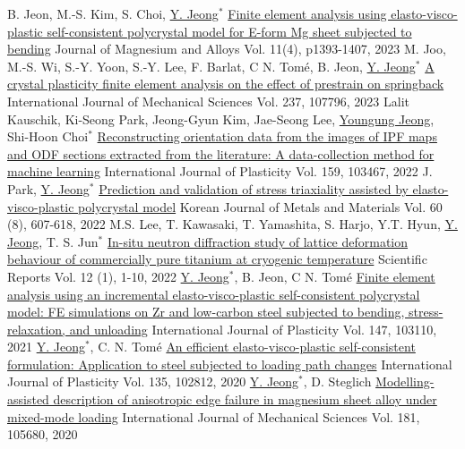 \begin{cventries}
  \cventry
  {B. Jeon, M.-S. Kim, S. Choi, \underline{Y. Jeong}$^*$}
  {\href{https://doi.org/10.1016/j.jma.2022.10.017}{Finite element analysis using elasto-visco-plastic self-consistent polycrystal model for E-form Mg sheet subjected to bending}}
  {Journal of Magnesium and Alloys}
  {Vol. 11(4), p1393-1407, 2023}
  {
  }
  \cventry
  {M. Joo, M.-S. Wi, S.-Y. Yoon, S.-Y. Lee, F. Barlat, C N. Tom\'{e}, B. Jeon, \underline{Y. Jeong}$^*$}
  {\href{https://doi.org/10.1016/j.ijmecsci.2022.107796}{A crystal plasticity finite element analysis on the effect of prestrain on springback}}
  {International Journal of Mechanical Sciences}
  {Vol. 237, 107796, 2023}
  {
  }
  \cventry
  {Lalit Kauschik, Ki-Seong Park, Jeong-Gyun Kim, Jae-Seong Lee, \underline{Youngung Jeong}, Shi-Hoon Choi$^*$}
  {\href{https://doi.org/10.1016/j.ijplas.2022.103467}{Reconstructing orientation data from the images of IPF maps and ODF sections extracted from the literature: A data-collection method for machine learning}}
  {International Journal of Plasticity}
  {Vol. 159, 103467, 2022}
  {
  }
  \cventry
  {J. Park, \underline{Y. Jeong}$^*$}
  {\href{http://dx.doi.org/10.3365/KJMM.2022.60.8.607}{Prediction and validation of stress triaxiality assisted by elasto-visco-plastic polycrystal model}}
  {Korean Journal of Metals and Materials}
  {Vol. 60 (8), 607-618, 2022}
  {
  }
  \cventry
  {M.S. Lee, T. Kawasaki, T. Yamashita, S. Harjo, Y.T. Hyun, \underline{Y. Jeong}, T. S. Jun$^*$}
  {\href{https://doi.org/10.1038/s41598-022-07640-3}{In-situ neutron diffraction study of lattice deformation behaviour of commercially pure titanium at cryogenic temperature}}
  {Scientific Reports}
  {Vol. 12 (1), 1-10, 2022}
  {
  }
  \cventry
  {\underline{Y. Jeong}$^*$, B. Jeon, C N. Tom\'{e}}
  {\href{https://doi.org/10.1016/j.ijplas.2021.103110}{Finite element analysis using an incremental elasto-visco-plastic self-consistent polycrystal model: FE simulations on Zr and low-carbon steel subjected to bending, stress-relaxation, and unloading}}
  {International Journal of Plasticity}
  {Vol. 147, 103110, 2021}
  {
  }
  \cventry
  {\underline{Y. Jeong}$^*$, C. N. Tom\'{e}}
  {\href{https://doi.org/10.1016/j.ijplas.2020.102812}{An efficient elasto-visco-plastic self-consistent formulation: Application to steel subjected to loading path changes}}
  {International Journal of Plasticity}
  {Vol. 135, 102812, 2020}
  {
  }
  \cventry
  {\underline{Y. Jeong}$^*$, D. Steglich}
  {\href{https://doi.org/10.1016/j.ijmecsci.2020.105680}{Modelling-assisted description of anisotropic edge failure in magnesium sheet alloy under mixed-mode loading}}
  {International Journal of Mechanical Sciences}
  {Vol. 181, 105680, 2020}
  {
  }


\end{cventries}
